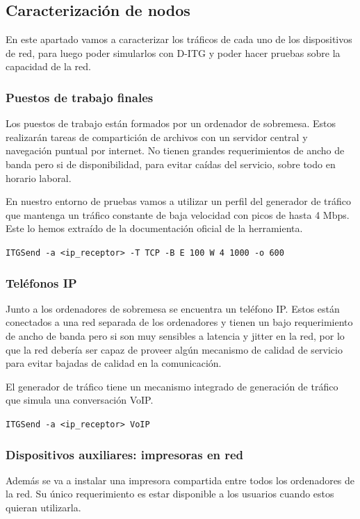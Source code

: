 \subsection{Caracterización de nodos}
En este apartado vamos a caracterizar los tráficos de cada uno de los dispositivos de red, para luego poder simularlos con D-ITG y poder hacer pruebas sobre la capacidad de la red.

\subsubsection{Puestos de trabajo finales}
Los puestos de trabajo están formados por un ordenador de sobremesa. Estos realizarán tareas de compartición de archivos con un servidor central y navegación puntual por internet. No tienen grandes requerimientos de ancho de banda pero si de disponibilidad, para evitar caídas del servicio, sobre todo en horario laboral.

En nuestro entorno de pruebas vamos a utilizar un perfil del generador de tráfico que mantenga un tráfico constante de baja velocidad con picos de hasta 4 Mbps. Este lo hemos extraído de la documentación oficial de la herramienta.\cite{DITG281M63:online}

\lstinline{ITGSend -a <ip_receptor> -T TCP -B E 100 W 4 1000 -o 600}

\subsubsection{Teléfonos IP}
Junto a los ordenadores de sobremesa se encuentra un teléfono IP. Estos están conectados a una red separada de los ordenadores y tienen un bajo requerimiento de ancho de banda pero si son muy sensibles a latencia y jitter en la red, por lo que la red debería ser capaz de proveer algún mecanismo de calidad de servicio para evitar bajadas de calidad en la comunicación.

El generador de tráfico tiene un mecanismo integrado de generación de tráfico que simula una conversación VoIP.

\lstinline{ITGSend -a <ip_receptor> VoIP}

\subsubsection{Dispositivos auxiliares: impresoras en red}
Además se va a instalar una impresora compartida entre todos los ordenadores de la red. Su único requerimiento es estar disponible a los usuarios cuando estos quieran utilizarla.

